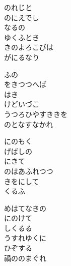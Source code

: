 \documentclass[10pt,b5j]{tarticle} %
\begin{document}
\vspace{1.5em} %
\newcommand{\linespace}{0.5em} %
\newcommand{\blocksize}{0.5\hsize} %
\begin{enumerate} %
    \begin{minipage}[c]{\blocksize}
    
        \vspace{\linespace}
        \item
        のれじと\\
        のにえでし\\
        なるの\\
        ゆくふとき\\
        きのよろこびは\\
        がにるなり
        
        \vspace{\linespace}
        \item
        ふの\\
        をきつつへば\\
        はき\\
        けどいづこ\\
        うつろひやすききを\\
        のとなすなかれ
        
        \vspace{\linespace}
        \item
        にのもく\\
        げばしの\\
        にきて\\
        のはあふれつつ\\
        きをにして\\
        くるふ
        
        \vspace{\linespace}
        \item
        めはてなきの\\
        にのけて\\
        しくるる\\
        うすれゆくに\\
        ひぞする\\
        禍ののまぐれ
        

\end{minipage}
\end{enumerate}
\end{document}
